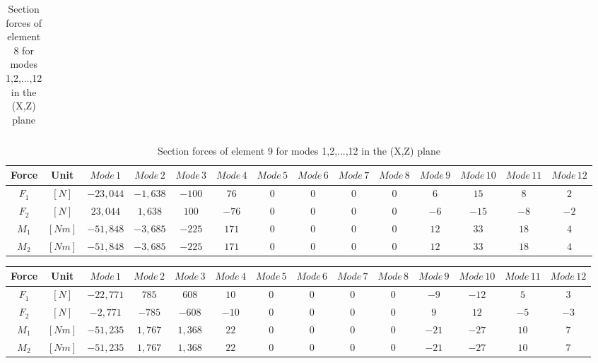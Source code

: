 \documentclass[11pt,a4paper,titlepage]{report}
\begin{document}
\begin{appendix}
\begin{landscape}
\begin{table}[]
\begin{tiny}
\begin{tabular}{c|c|c|c|c|c|c|c|c|c|c|c|c|c}
        \end{tabular}
        \end{tiny}
    \caption{Section forces of element 8 for modes 1,2,...,12 in the (X,Z) plane}
    \label{tab:my_label}
\end{table}
\begin{table}[]
    \centering
    \begin{tiny}
    \begin{tabular}{c|c|c|c|c|c|c|c|c|c|c|c|c|c}
    Force & Unit & $Mode\,1$ & $Mode\,2$ & $Mode\,3$ & $Mode\,4$ & $Mode\,5$ & $Mode\,6$ & $Mode\,7$ & $Mode\,8$ & $Mode\,9$ & $Mode\,10$ & $Mode\,11$ & $Mode\,12$\\
    \hline
   $F_1$ & $[N]$ & $-23,044$ & $-1,638$ & $-100$ & $76 $ & $0$ & $0$ & $0$ & $0$ & $6$ & $15$ & $8$ &  $2$\\
   $F_2$ & $[N]$ & $23,044$ & $1,638$ & $100$ & $-76 $ & $0$ & $0$ & $0$ & $0$ & $-6$ & $-15$ & $-8$ &  $-2$\\
    $M_1$ & $[Nm]$ & $ -51,848 $ & $-3,685$ & $-225$ & $171$ & $0$ & $0$ & $0$ & $0$ & $12$ & $33$ & $18$ &  $4$\\
    $M_2$ & $[Nm]$ & $ -51,848 $ & $-3,685$ & $-225$ & $171$ & $0$ & $0$ & $0$ & $0$ & $12$ & $33$ & $18$ &  $4$\\
        \end{tabular}
        \end{tiny}
    \caption{Section forces of element 9 for modes 1,2,...,12 in the (X,Z) plane}
    \label{tab:my_label}
\end{table}
\begin{table}[]
    \centering
    \begin{tiny}
    \begin{tabular}{c|c|c|c|c|c|c|c|c|c|c|c|c|c}
    Force & Unit & $Mode\,1$ & $Mode\,2$ & $Mode\,3$ & $Mode\,4$ & $Mode\,5$ & $Mode\,6$ & $Mode\,7$ & $Mode\,8$ & $Mode\,9$ & $Mode\,10$ & $Mode\,11$ & $Mode\,12$\\
    \hline
   $F_1$ & $[N]$ & $-22,771$ & $785 $ & $608$ & $10$ & $0$ & $0$ & $0$ & $0$ & $-9$ & $-12$ & $5$ &  $3$\\
   $F_2$ & $[N]$ & $-2,771$ & $-785 $ & $-608$ & $-10$ & $0$ & $0$ & $0$ & $0$ & $9$ & $12$ & $-5$ &  $-3$\\
    $M_1$ & $[Nm]$ & $-51,235 $ & $1,767$ & $1,368$ & $22$ & $0$ & $0$ & $0$ & $0$ & $-21$ & $-27$ & $10$ &  $7$\\
    $M_2$ & $[Nm]$ & $-51,235 $ & $1,767$ & $1,368$ & $22$ & $0$ & $0$ & $0$ & $0$ & $-21$ & $-27$ & $10$ &  $7$\\

\end{tabular}
\end{tiny}
\end{table}
\end{landscape}
\end{appendix}
\end{document}
